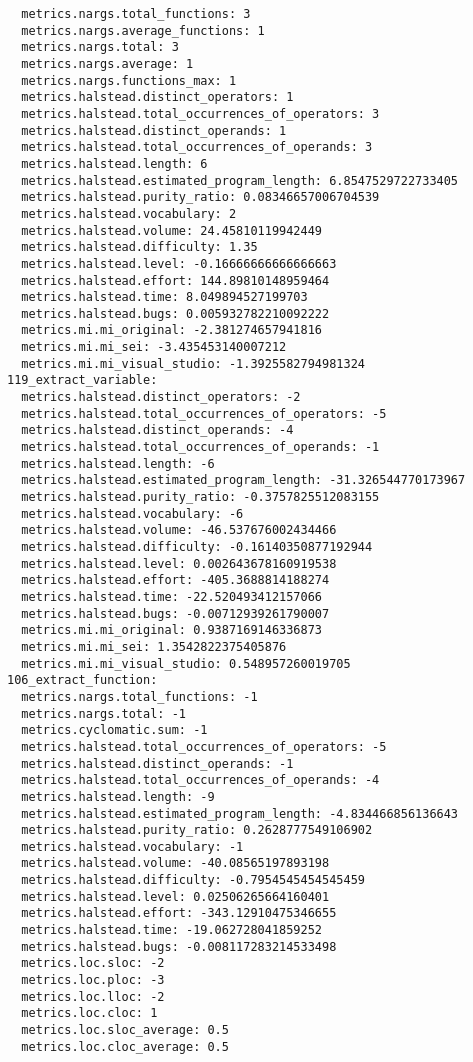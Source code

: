 \begin{verbatim}
  metrics.nargs.total_functions: 3
  metrics.nargs.average_functions: 1
  metrics.nargs.total: 3
  metrics.nargs.average: 1
  metrics.nargs.functions_max: 1
  metrics.halstead.distinct_operators: 1
  metrics.halstead.total_occurrences_of_operators: 3
  metrics.halstead.distinct_operands: 1
  metrics.halstead.total_occurrences_of_operands: 3
  metrics.halstead.length: 6
  metrics.halstead.estimated_program_length: 6.8547529722733405
  metrics.halstead.purity_ratio: 0.08346657006704539
  metrics.halstead.vocabulary: 2
  metrics.halstead.volume: 24.45810119942449
  metrics.halstead.difficulty: 1.35
  metrics.halstead.level: -0.16666666666666663
  metrics.halstead.effort: 144.89810148959464
  metrics.halstead.time: 8.049894527199703
  metrics.halstead.bugs: 0.005932782210092222
  metrics.mi.mi_original: -2.381274657941816
  metrics.mi.mi_sei: -3.435453140007212
  metrics.mi.mi_visual_studio: -1.3925582794981324
119_extract_variable:
  metrics.halstead.distinct_operators: -2
  metrics.halstead.total_occurrences_of_operators: -5
  metrics.halstead.distinct_operands: -4
  metrics.halstead.total_occurrences_of_operands: -1
  metrics.halstead.length: -6
  metrics.halstead.estimated_program_length: -31.326544770173967
  metrics.halstead.purity_ratio: -0.3757825512083155
  metrics.halstead.vocabulary: -6
  metrics.halstead.volume: -46.537676002434466
  metrics.halstead.difficulty: -0.16140350877192944
  metrics.halstead.level: 0.002643678160919538
  metrics.halstead.effort: -405.3688814188274
  metrics.halstead.time: -22.520493412157066
  metrics.halstead.bugs: -0.00712939261790007
  metrics.mi.mi_original: 0.9387169146336873
  metrics.mi.mi_sei: 1.3542822375405876
  metrics.mi.mi_visual_studio: 0.548957260019705
106_extract_function:
  metrics.nargs.total_functions: -1
  metrics.nargs.total: -1
  metrics.cyclomatic.sum: -1
  metrics.halstead.total_occurrences_of_operators: -5
  metrics.halstead.distinct_operands: -1
  metrics.halstead.total_occurrences_of_operands: -4
  metrics.halstead.length: -9
  metrics.halstead.estimated_program_length: -4.834466856136643
  metrics.halstead.purity_ratio: 0.2628777549106902
  metrics.halstead.vocabulary: -1
  metrics.halstead.volume: -40.08565197893198
  metrics.halstead.difficulty: -0.7954545454545459
  metrics.halstead.level: 0.02506265664160401
  metrics.halstead.effort: -343.12910475346655
  metrics.halstead.time: -19.062728041859252
  metrics.halstead.bugs: -0.008117283214533498
  metrics.loc.sloc: -2
  metrics.loc.ploc: -3
  metrics.loc.lloc: -2
  metrics.loc.cloc: 1
  metrics.loc.sloc_average: 0.5
  metrics.loc.cloc_average: 0.5

\end{verbatim}
